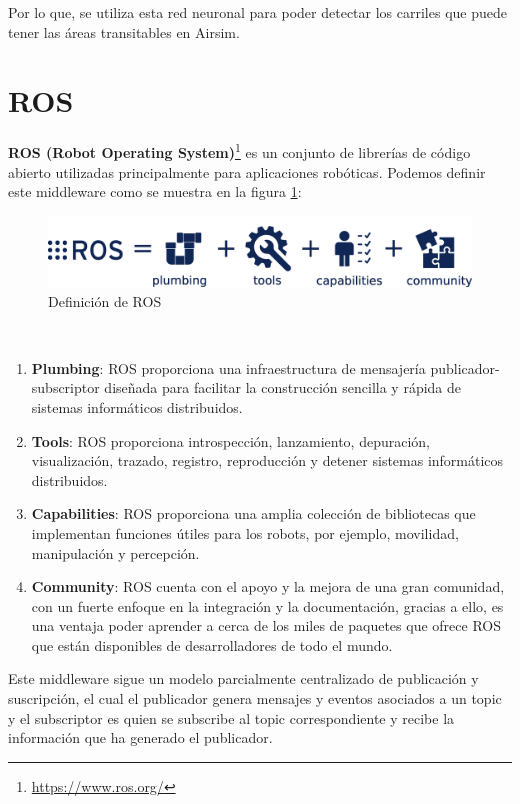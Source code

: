 Por lo que, se utiliza esta red neuronal para poder detectar los carriles que puede tener las áreas transitables en Airsim.
\section{ROS}
\label{sec:ros}
\textbf{ROS (Robot Operating System)}\footnote{\url{https://www.ros.org/}} es un conjunto de librerías de código abierto utilizadas principalmente para aplicaciones robóticas. 
Podemos definir este middleware como se muestra en la figura \ref{fig:ROS}:

\begin{figure} [H]
    \begin{center}
      \includegraphics[scale=0.18]{figs/Plataformas_Desarollo/ros-equation.png}
    \end{center}
    \caption{Definición de ROS}
    \label{fig:ROS}
  \end{figure}\


\begin{enumerate}
    \item \textbf{Plumbing}: ROS proporciona una infraestructura de mensajería publicador-subscriptor diseñada para facilitar la construcción sencilla y rápida de sistemas informáticos
    distribuidos.
    \item \textbf{Tools}: ROS proporciona introspección, lanzamiento, depuración, visualización, trazado, registro, reproducción y detener sistemas informáticos distribuidos.
    \item \textbf{Capabilities}: ROS proporciona una amplia colección de bibliotecas que implementan funciones útiles para los robots, por ejemplo, movilidad, manipulación y percepción.
    \item \textbf{Community}: ROS cuenta con el apoyo y la mejora de una gran comunidad, con un fuerte enfoque en la integración y la documentación, gracias a ello, es una ventaja poder
    aprender a cerca de los miles de paquetes que ofrece ROS que están disponibles de desarrolladores de todo el mundo.
\end{enumerate}

Este middleware sigue un modelo parcialmente centralizado de publicación y suscripción, el cual el publicador genera mensajes y eventos asociados a un topic y el subscriptor
es quien se subscribe al topic correspondiente y recibe la información que ha generado el publicador. \newline

